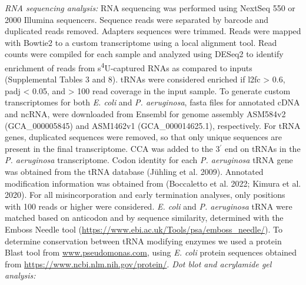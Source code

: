 \documentclass[times, twoside]{zHenriquesLab-StyleBioRxiv}
\begin{document}
\textit{RNA sequencing analysis:}
\newline
RNA sequencing was performed using NextSeq 550 or 2000 Illumina sequencers. Sequence reads were separated by barcode and duplicated reads removed. Adapters sequences were trimmed. Reads were mapped with Bowtie2 to a custom transcriptome using a local alignment tool. Read counts were compiled for each sample and analyzed using DESeq2 to identify enrichment of reads from s\textsuperscript{4}U-captured RNAs as compared to inputs (Supplemental Tables 3 and 8). tRNAs were considered enriched if l2fc > 0.6, padj < 0.05, and > 100 read coverage in the input sample. To generate custom transcriptomes for both \textit{E. coli} and \textit{P. aeruginosa}, fasta files for annotated cDNA and ncRNA, were downloaded from Ensembl for genome assembly ASM584v2 (GCA\_000005845) and ASM1462v1 (GCA\_000014625.1), respectively. For tRNA genes, duplicated sequences were removed, so that only unique sequences are present in the final transcriptome. CCA was added to the 3\(^{\prime}\) end on tRNAs in the \textit{P. aeruginosa} transcriptome. Codon identity for each \textit{P. aeruginosa} tRNA gene was obtained from the tRNA database (Jühling et al. 2009). Annotated modification information was obtained from (Boccaletto et al. 2022; Kimura et al. 2020). For all misincorporation and early termination analyses, only positions with 100 reads or higher were considered. \textit{E. coli} and \textit{P. aeruginosa} tRNA were matched based on anticodon and by sequence similarity, determined with the Emboss Needle tool (\href{https://www.ebi.ac.uk/Tools/psa/emboss_needle/}{https://www.ebi.ac.uk/Tools/psa/emboss\_needle/}). To determine conservation between tRNA modifying enzymes we used a protein Blast tool from \href{http://www.pseudomonas.com/}{www.pseudomonas.com,} using \textit{E. coli} protein sequences obtained from \href{https://www.ncbi.nlm.nih.gov/protein/}{https://www.ncbi.nlm.nih.gov/protein/}. 
\newline
\newline
\textit{Dot blot and acrylamide gel analysis: }
\newline
\end{document}
